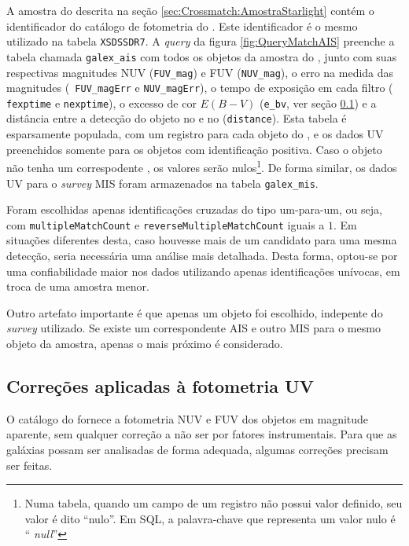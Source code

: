 A amostra do \starlight descrita na seção \ref{sec:Crossmatch:AmostraStarlight}
contém o identificador do catálogo de fotometria do \SDSS. Este identificador é
o mesmo utilizado na tabela {\tt XSDSSDR7}. A {\em query} da figura
\ref{fig:QueryMatchAIS} preenche a tabela chamada {\tt galex\_ais} com todos os
objetos da amostra do \starlight, junto com suas respectivas magnitudes NUV
({\tt FUV\_mag}) e FUV ({\tt NUV\_mag}), o erro na medida das magnitudes ({\tt
FUV\_magErr} e {\tt NUV\_magErr}), o tempo de exposição em cada filtro ({\tt
fexptime} e {\tt nexptime}), o excesso de cor $E(B-V)$ ({\tt e\_bv}, ver seção
\ref{sec:Crossmatch:DefAmostras:Correcoes}) e a distância entre a detecção do
objeto no \galex e no \SDSS ({\tt distance}). Esta tabela é esparsamente
populada, com um registro para cada objeto do \starlight, e os dados UV
preenchidos somente para os objetos com identificação positiva. Caso o objeto
não tenha um correspodente \galex, os valores serão nulos\footnote{Numa tabela,
quando um campo de um registro não possui valor definido, seu valor é dito
``nulo''. Em SQL, a palavra-chave que representa um valor nulo é ``{\em
null}''}. De forma similar, os dados UV para o {\em survey} MIS foram
armazenados na tabela {\tt galex\_mis}.

Foram escolhidas apenas identificações cruzadas do tipo um-para-um, ou seja, com
{\tt multipleMatchCount} e {\tt reverseMultipleMatchCount} iguais a $1$. Em
situações diferentes desta, caso houvesse mais de um candidato para uma mesma
detecção, seria necessária uma análise mais detalhada. Desta forma, optou-se por
uma confiabilidade maior nos dados utilizando apenas identificações unívocas, em
troca de uma amostra menor.

Outro artefato importante é que apenas um objeto foi escolhido, indepente do
{\em survey} \galex utilizado. Se existe um correspondente AIS e outro MIS para
o mesmo objeto da amostra, apenas o mais próximo é considerado.\fixme


\subsection{Correções aplicadas à fotometria UV}
\label{sec:Crossmatch:DefAmostras:Correcoes}

O catálogo do \galex fornece a fotometria NUV e FUV dos objetos em magnitude
aparente, sem qualquer correção a não ser por fatores instrumentais. Para que as
galáxias possam ser analisadas de forma adequada, algumas correções precisam ser
feitas.

